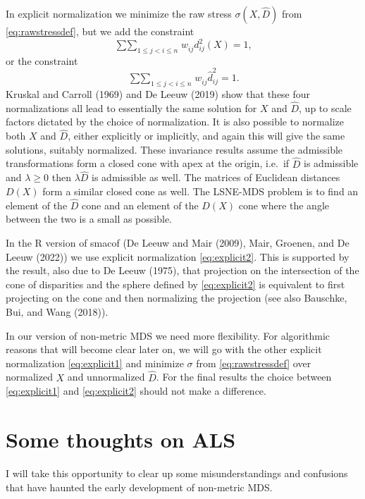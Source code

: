 \documentclass[
  12pt,
]{article}
\newcommand{\jis}{\mathop{\sum\sum}_{1\leq j<i\leq n}}
\begin{document}
In explicit normalization we minimize the raw stress \(\sigma(X,\hat D)\)
from \eqref{eq:rawstressdef}, but we add the constraint
\begin{equation}
\jis w_{ij}^{\ }d_{ij}^2(X)=1,
\label{eq:explicit1}
\end{equation}
or the constraint
\begin{equation}
\jis w_{ij}^{\ }\hat d_{ij}^2=1.
\label{eq:explicit2}
\end{equation}
Kruskal and Carroll (1969) and De Leeuw (2019) show that these
four normalizations all lead to essentially the same solution for \(X\)
and \(\hat D\), up to scale factors dictated by the choice of
normalization. It is also possible to normalize both \(X\) and \(\hat D\),
either explicitly or implicitly, and again this will give the same
solutions, suitably normalized. These invariance results assume the
admissible transformations form a closed cone with apex at the origin,
i.e.~if \(\hat D\) is admissible and \(\lambda\geq 0\) then \(\lambda\hat D\)
is admissible as well. The matrices of Euclidean distances \(D(X)\) form a
similar closed cone as well. The LSNE-MDS problem is to find an element of the
\(\hat D\) cone and an element of the \(D(X)\) cone where the angle between
the two is a small as possible.

In the R version of smacof (De Leeuw and Mair (2009),
Mair, Groenen, and De Leeuw (2022)) we use explicit normalization
\eqref{eq:explicit2}. This is supported by the result, also due to
De Leeuw (1975), that projection on the intersection of the cone of
disparities and the sphere defined by \eqref{eq:explicit2} is equivalent
to first projecting on the cone and then normalizing the projection (see
also Bauschke, Bui, and Wang (2018)).

In our version of non-metric MDS we need more flexibility. For algorithmic
reasons that will become clear later on, we will go with the other explicit
normalization \eqref{eq:explicit1} and minimize \(\sigma\) from
\eqref{eq:rawstressdef} over normalized \(X\) and unnormalized \(\hat D\).
For the final results the choice between \eqref{eq:explicit1} and
\eqref{eq:explicit2} should not make a difference.

\section{Some thoughts on ALS}\label{some-thoughts-on-als}

I will take this opportunity to clear up some misunderstandings and confusions
that have haunted the early development of non-metric MDS.
\end{document}
